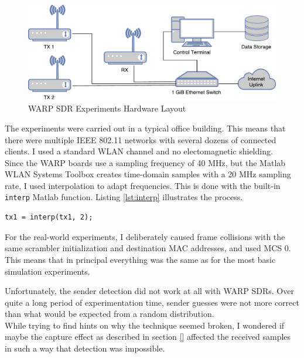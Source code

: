 \begin{figure}[H]
	\centering
	\includegraphics[width=\textwidth]{gfx/images/warp-layout}
	\caption{WARP SDR Experiments Hardware Layout}
	\label{fig:warp-layout}
\end{figure}

The experiments were carried out in a typical office building. This means that there were multiple IEEE 802.11 networks with several dozens of connected clients. I used a standard WLAN channel and no electomagnetic shielding.\\

Since the \gls{WARP} boards use a sampling frequency of 40 MHz, but the Matlab WLAN Systems Toolbox creates time-domain samples with a 20 MHz sampling rate, I used interpolation to adapt frequencies. This is done with the built-in \texttt{interp} Matlab function. Listing \ref{lst:interp} illustrates the process.

\begin{lstlisting}[captionpos=b,caption={Interpolate Sampling Rate},label=lst:interp]
% Interpolate to get from 20 to 40 MHz sampling rate
tx1 = interp(tx1, 2);
\end{lstlisting}

For the real-world experiments, I deliberately caused frame collisions with the same scrambler initialization and destination MAC addresses, and used \gls{MCS} 0. This means that in principal everything was the same as for the most basic simulation experiments.

Unfortunately, the sender detection did not work at all with \gls{WARP} \glspl{SDR}. Over quite a long period of experimentation time, sender guesses were not more correct than what would be expected from a random distribution.\\

While trying to find hints on why the technique seemed broken, I wondered if maybe the capture effect as described in section \ref{} affected the received samples in such a way that detection was impossible.


